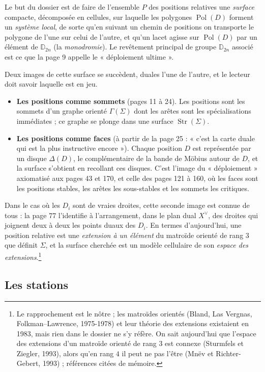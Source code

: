 \documentclass[11pt,a4paper]{article}
\begin{document}
Le but du dossier est de faire de l'ensemble $P$ des positions
relatives une \emph{surface} compacte, décomposée en cellules, sur laquelle les
polygones $\operatorname{Pol}(D)$ forment un \emph{système local}, de sorte
qu'en suivant un chemin de positions on transporte le polygone de l'une sur
celui de l'autre, et qu'un lacet agisse sur $\operatorname{Pol}(D)$ par un
élément de $\mathbb{D}_{2n}$ (la \emph{monodromie}). Le revêtement principal de
groupe $\mathbb{D}_{2n}$ associé est ce que la page 9 appelle le
« déploiement ultime ».

Deux images de cette surface se succèdent, duales l'une de l'autre, et le
lecteur doit savoir laquelle est en jeu.
\begin{itemize}
\item \textbf{Les positions comme sommets} (pages 11 à 24). Les positions sont
les sommets d'un graphe orienté $\Gamma(\Sigma)$ dont les arêtes sont les
spécialisations immédiates ; ce graphe se plonge dans une surface
$\operatorname{Str}(\Sigma)$.
\item \textbf{Les positions comme faces} (à partir de la page 25 : « c'est la carte duale qui est la plus instructive encore »). Chaque position $D$ est
représentée par un disque $\Delta(D)$, le complémentaire de la bande de Möbius
autour de $D$, et la surface s'obtient en recollant ces disques. C'est
l'image du « déploiement » axiomatisé aux pages 43 et 170, et celle des
pages 121 à 160, où les faces sont les positions stables, les arêtes les
sous-stables et les sommets les critiques.
\end{itemize}
Dans le cas où les $D_i$ sont de vraies droites, cette seconde image est
connue de tous : la page 77 l'identifie à l'arrangement, dans le plan dual
$X^{\vee}$, des droites qui joignent deux à deux les points duaux des $D_i$. En
termes d'aujourd'hui, une position relative est une \emph{extension à un
élément} du matroïde orienté de rang $3$ que définit $\Sigma$, et la surface
cherchée est un modèle cellulaire de son \emph{espace des
extensions}.\footnote{Le rapprochement est le nôtre ; les matroïdes orientés
(Bland, Las Vergnas, Folkman–Lawrence, 1975-1978) et leur théorie des
extensions existaient en 1983, mais rien dans le dossier ne s'y réfère. On sait
aujourd'hui que l'espace des extensions d'un matroïde orienté de rang $3$ est
connexe (Sturmfels et Ziegler, 1993), alors qu'en rang $4$ il peut ne pas
l'être (Mnëv et Richter-Gebert, 1993) ; références citées de mémoire.}

\subsection*{Les stations}
\end{document}
